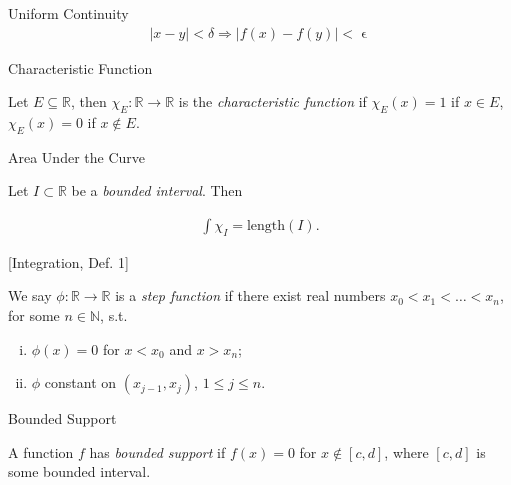\documentclass[10pt]{article} %
\renewcommand{\leq}{\leqslant}
\begin{document}
\begin{multicols}{3}
\begin{definition}{}{Uniform Continuity}
        \begin{align*}
            |x - y| < \delta \Rightarrow |f(x) - f(y)| < \upvarepsilon
        \end{align*}

\end{definition}

\begin{definition}{}{Characteristic Function}

    Let $E \subseteq \mathbb{R}$, then $\chi_E: \mathbb{R} \to \mathbb{R}$ is the \emph{characteristic function} if $\chi_E(x) = 1$ if $x \in E$, $\chi_E(x) = 0$ if $x \not\in E$.

\end{definition}

\begin{definition}{}{Area Under the Curve}

    Let $I \subset \mathbb{R}$ be a \emph{bounded interval}. Then

        \begin{align*}
            \int \chi_I = \textrm{length}(I).
        \end{align*}

\end{definition}

\begin{definition}{[Integration, Def. 1]}{}

    We say $\phi: \mathbb{R} \to \mathbb{R}$ is a \emph{step function} if there exist real numbers $x_0 < x_1 < \hdots < x_n$, for some $n \in \mathbb{N}$, s.t.

        \begin{enumerate}[(i)]
            \setlength{\parskip}{0em}
            \item $\phi(x) = 0$ for $x < x_0$ and $x > x_n$;
            \item $\phi$ constant on $(x_{j-1},x_j)$, $1 \leq j \leq n$.
        \end{enumerate}

\end{definition}

\begin{definition}{}{Bounded Support}

    A function $f$ has \emph{bounded support} if $f(x) = 0$ for $x \not\in [c,d]$, where $[c,d]$ is some bounded interval.


\end{definition}
\end{multicols}
\end{document}
